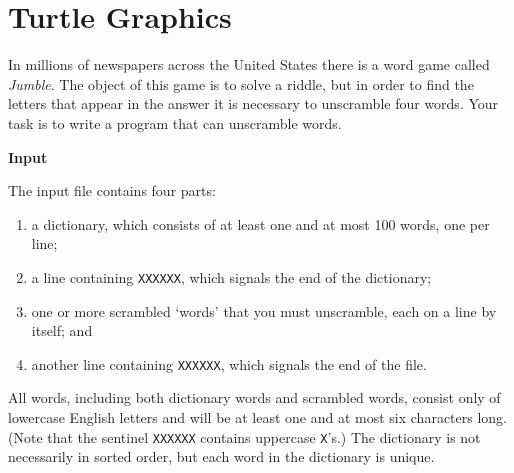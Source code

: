 \documentclass[12pt]{article}
\begin{document}

\newcommand{\hmwkClass}{CSCI 255}
\newcommand{\hmwkSemester}{Spring 2016}

\newcommand{\hmwkAuthorName}{Zhuoming Tan}
\newcommand{\hmwkAuthorID}{ztan}

\newcommand{\hmwkAssignmentNum}{2}

\newcommand{\hmwkProblemNum}{1}

\newcommand{\hmwkCollaborators}{Rafeal Zuniga}
\thispagestyle{fancycollab}



\section{Turtle Graphics}
In millions of newspapers across the United States there is a word game called \textit{Jumble}. The object of this game is to solve a riddle, but in order to find the letters that appear in the answer it is necessary to unscramble four words. Your task is to write a program that can unscramble words.

\bigskip

\noindent\textbf{Input}

The input file contains four parts:
\begin{enumerate}
  \item a dictionary, which consists of at least one and at most 100 words, one per line;
  \item a line containing \texttt{XXXXXX}, which signals the end of the dictionary;
  \item one or more scrambled `words' that you must unscramble, each on a line by itself; and
  \item another line containing \texttt{XXXXXX}, which signals the end of the file.
\end{enumerate}
All words, including both dictionary words and scrambled words, consist only of lowercase English letters and will be at least one and at most six characters long. (Note that the sentinel \texttt{XXXXXX} contains uppercase \texttt{X}'s.) The dictionary is not necessarily in sorted order, but each word in the dictionary is unique.
\end{document}
